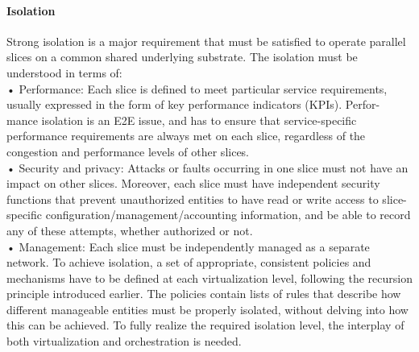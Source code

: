 \documentclass{article}
\begin{document}
\paragraph{Isolation}
Strong isolation is a major requirement that must
be satisfied to operate parallel slices on a common shared underlying substrate. The isolation
must be understood in terms of:\\
• Performance: Each slice is defined to meet particular service requirements, usually expressed in the
form of key performance indicators (KPIs). Perfor-
mance isolation is an E2E issue, and has to ensure
that service-specific performance requirements are
always met on each slice, regardless of the congestion and performance levels of other slices.\\
• Security and privacy: Attacks or faults occurring in one slice must not have an impact on
other slices. Moreover, each slice must have
independent security functions that prevent unauthorized entities to have read or write access to
slice-specific configuration/management/accounting information, and be able to record any of
these attempts, whether authorized or not.\\
• Management: Each slice must be independently managed as a separate network.
To achieve isolation, a set of appropriate, consistent policies and mechanisms have to be defined
at each virtualization level, following the recursion
principle introduced earlier. The policies contain lists of rules that describe how different manageable entities must be properly isolated, without delving into how this can be achieved.
To fully realize the
required isolation level, the interplay of both virtualization and orchestration is needed.
\end{document}
